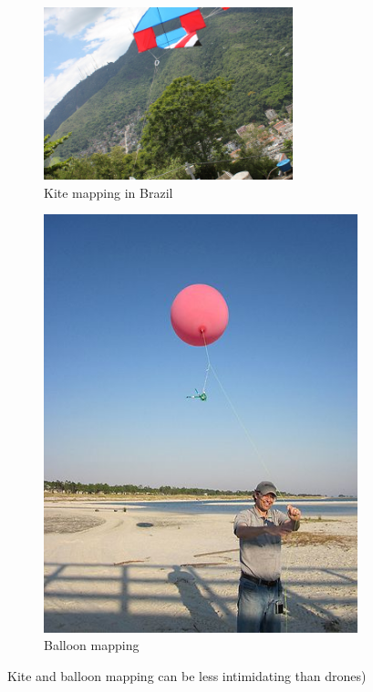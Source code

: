 \documentclass[a4paper,12pt,twoside]{article}
\begin{document}
\begin{figure}[H]
\begin{subfigure}{0.5\textwidth}
\includegraphics[width=0.9\linewidth, height=5cm]{images/Kite_mapping_in_Brazil.jpeg} 
\caption{Kite mapping in Brazil}
\label{fig:kite mapping}
\end{subfigure}
\begin{subfigure}{0.5\textwidth}
\includegraphics[width=0.9\linewidth]{images/Baloon_mapping.jpg}
\caption{Balloon mapping}
\label{fig:baloon mapping}
\end{subfigure}
\caption{Kite and balloon mapping can be less intimidating than drones)}
\label{fig:image2}
\end{figure}
\end{document}
